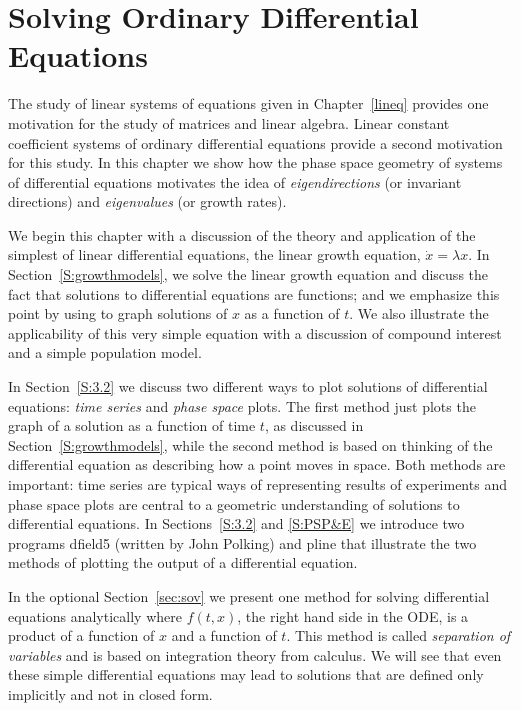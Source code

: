 \chapter{Solving Ordinary Differential Equations}
\label{chap:SolveOdes}

\normalsize

The study of linear systems of equations given in Chapter~\ref{lineq}
provides one motivation for the study of matrices and linear algebra.  
Linear constant coefficient systems of ordinary differential equations 
provide a second motivation for this study.  In this chapter we
show how the phase space geometry of systems of differential equations
motivates the idea of {\em eigendirections} (or invariant directions) and
{\em eigenvalues\/} (or growth rates).  

We begin this chapter with a discussion of the theory and application
of the simplest of linear differential equations, the linear growth equation,
$\dot{x}=\lambda x$.  In Section~\ref{S:growthmodels}, we solve the linear
growth equation and discuss the fact that solutions to differential equations
are functions; and we emphasize this point by using \Matlab to graph
solutions of $x$ as a function of $t$.  We also illustrate the applicability
of this very simple equation with a discussion of compound interest and
a simple population model.

In Section~\ref{S:3.2} we discuss two different ways to plot solutions of
differential equations: {\em time series\/} and {\em phase space\/} plots.
The first method just plots the graph of a solution as a function
of time $t$, as discussed in Section~\ref{S:growthmodels}, while the second
method is based on thinking of the differential equation as describing
how a point moves in space.  Both methods are important: time series are
typical ways of representing results of experiments and phase space plots
are central to a geometric understanding of solutions to differential
equations.  In Sections~\ref{S:3.2} and \ref{S:PSP&E} we introduce two \Matlab
programs {\sf dfield5} (written by John Polking) and 
{\sf pline} that illustrate the two methods of plotting the output of a 
differential equation.

In the optional Section~\ref{sec:sov} we present one method for solving
differential equations analytically where $f(t,x)$, the right hand side in 
the ODE, is a product of a function of $x$ and a function of $t$. This method 
is called {\em separation of variables} and is based on integration theory
from calculus.  We will see that even these simple differential
equations may lead to solutions that are defined only implicitly and not in
closed form.


